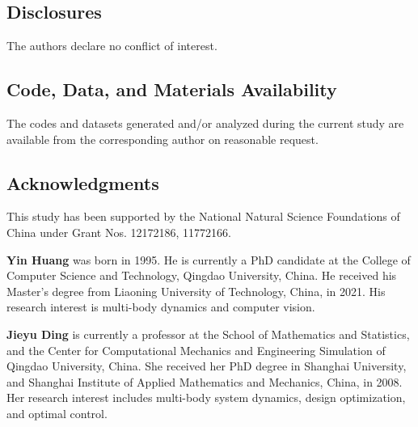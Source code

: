 \documentclass[12pt]{spieman}  %
\begin{document}
\begin{spacing}{2}
\subsection*{Disclosures}
	The authors declare no conflict of interest.

\subsection* {Code, Data, and Materials Availability}
The codes and datasets generated and/or analyzed during the current study are available from the corresponding author on reasonable request.


\subsection* {Acknowledgments}
	This study has been supported by the National Natural Science Foundations of China under Grant Nos. 12172186, 11772166.





\vspace{2ex}\noindent\textbf{Yin Huang} was born in 1995. He is currently a PhD candidate at the College of Computer Science and Technology, Qingdao University, China. He received his Master's degree from Liaoning University of Technology, China, in 2021. His research interest is multi-body dynamics and computer vision.

\vspace{2ex}\noindent\textbf{Jieyu Ding}  is currently a professor at the School of Mathematics and Statistics, and the Center for Computational Mechanics and Engineering Simulation of Qingdao University, China. She received her PhD degree in Shanghai University, and Shanghai Institute of Applied Mathematics and Mechanics, China, in 2008. Her research interest includes multi-body system dynamics, design optimization, and optimal control.

\listoffigures
\listoftables

\end{spacing}
\end{document}
